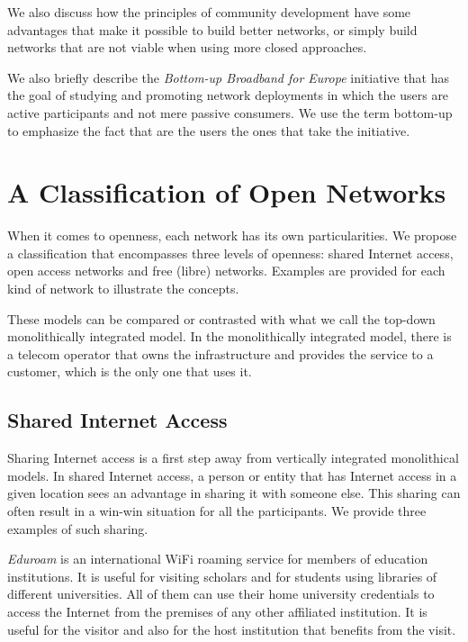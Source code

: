 \documentclass[journal]{IEEEtran}
\begin{document}
We also discuss how the principles of community development have some advantages that make it possible to build better networks, or simply build networks that are not viable when using more closed approaches.


We also briefly describe the \emph{Bottom-up Broadband for Europe} initiative that has the goal of studying and promoting network deployments in which the users are active participants and not mere passive consumers.
We use the term bottom-up to emphasize the fact that are the users the ones that take the initiative.

\section{A Classification of Open Networks}
When it comes to openness, each network has its own particularities.
We propose a classification that encompasses three levels of openness: shared Internet access, open access networks and free (libre) networks.
Examples are provided for each kind of network to illustrate the concepts.

These models can be compared or contrasted with what we call the top-down monolithically integrated model.
In the monolithically integrated model, there is a telecom operator that owns the infrastructure and provides the service to a customer, which is the only one that uses it.



\subsection{Shared Internet Access}

Sharing Internet access is a first step away from vertically integrated monolithical models.
In shared Internet access, a person or entity that has Internet access in a given location sees an advantage in sharing it with someone else.
This sharing can often result in a win-win situation for all the participants.
We provide three examples of such sharing.

\emph{Eduroam} is an international WiFi roaming service for members of education institutions.
It is useful for visiting scholars and for students using libraries of different universities.
All of them can use their home university credentials to access the Internet from the premises of any other affiliated institution.
It is useful for the visitor and also for the host institution that benefits from the visit.
\end{document}
